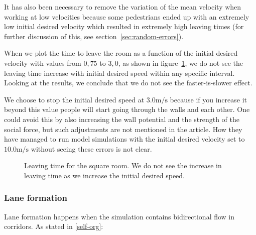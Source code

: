 It has also been necessary to remove the variation of the mean velocity when 
working at low velocities because some pedestrians ended up with an extremely 
low initial desired velocity which resulted in extremely high leaving times 
(for further discussion of this, see section~\ref{sec:random-errors}).

When we plot the time to leave the room as a function of the initial desired 
velocity with values from $0,75$ to $3,0$, as shown in 
figure~\ref{fig:square-room-leaving}, we do not see the leaving time increase 
with initial desired speed within any specific interval.  Looking at the 
results, we conclude that we do not see the faster-is-slower effect.

We choose to stop the initial desired speed at $3.0 \text{m}/\text{s}$ because 
if you increase it beyond this value people will start going through the walls 
and each other. One could avoid this by also increasing the wall potential and 
the strength of the social force, but such adjustments are not mentioned in 
the article. How they have managed to run model simulations with the initial 
desired velocity set to $10.0 \text{m}/\text{s}$ without seeing these errors 
is not clear.

\begin{figure}[ht]
    \centering
    \caption[Leaving time for the square room]{Leaving time for the square 
    room. We do not see the increase in leaving time as we increase the 
    initial desired speed.}
    \label{fig:square-room-leaving}
\end{figure}

\subsubsection{Lane formation}
Lane formation happens when the simulation contains bidirectional flow in 
corridors. As stated in \ref{self-org}:

